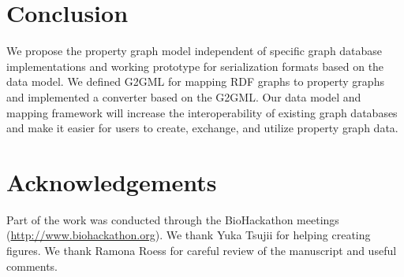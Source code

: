 \documentclass[runningheads]{llncs}
\begin{document}

\section{Conclusion}
We propose the property graph model independent of specific graph database implementations and working prototype for serialization formats based on the data model.
We defined G2GML for mapping RDF graphs to property graphs and implemented a converter based on the G2GML.
Our data model and mapping framework will increase the interoperability of existing graph databases and make it easier for users to create, exchange, and utilize property graph data.

\section*{Acknowledgements}
Part of the work was conducted through the BioHackathon meetings (\url{http://www.biohackathon.org}). We thank Yuka Tsujii for helping creating figures. We thank Ramona Roess for careful review of the manuscript and useful comments.
\end{document}

